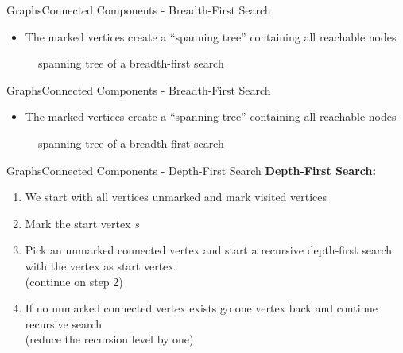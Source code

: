 
\begin{frame}{Graphs}{Connected Components - Breadth-First Search}
  \begin{itemize}
    \item
      The marked vertices create a \enquote{spanning tree} containing all
      reachable nodes
  \end{itemize}
  \begin{figure}
    \begin{adjustbox}{width=0.95\linewidth}
      
    \end{adjustbox}
    \caption{spanning tree of a breadth-first search}
  \end{figure}
\end{frame}


\begin{frame}{Graphs}{Connected Components - Breadth-First Search}
  \begin{itemize}
    \item
      The marked vertices create a \enquote{spanning tree} containing all
      reachable nodes
  \end{itemize}
  \begin{figure}
    \begin{adjustbox}{width=0.95\linewidth}
      
    \end{adjustbox}
    \caption{spanning tree of a breadth-first search}
  \end{figure}
\end{frame}


\begin{frame}{Graphs}{Connected Components - Depth-First Search}
  \textbf{Depth-First Search:}
  \begin{enumerate}
    \item<2->
      We start with all vertices unmarked and
      {\color{MainA}mark visited vertices}
    \item<3->
      Mark the start vertex {\color{MainA}$s$}
    \item<4->
      Pick an unmarked {\color{MainA}connected vertex} and start a
      {\color{MainA}recursive depth-first search} with the vertex as
      start vertex\\
      (continue on step 2)
    \item<5->
      If no unmarked connected vertex exists go one vertex back
      and continue recursive search\\
      (reduce the recursion level by one)
  \end{enumerate}
\end{frame}


